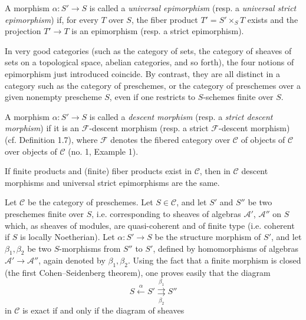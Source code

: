  A morphism $\alpha:S'\longrightarrow S$ is called a
\emph{universal epimorphism} (resp. a \emph{universal strict epimorphism}) if,
for every $T$ over $S$, the fiber product $T'=S'\times_ST$ exists and the
projection $T'\longrightarrow T$ is an epimorphism (resp. a strict
epimorphism).

In very good categories (such as the category of sets, the category of sheaves
of sets on a topological space, abelian categories, and so forth), the four
notions of epimorphism just introduced coincide. By contrast, they are all
distinct in a category such as the category of preschemes, or the category of
preschemes over a given nonempty prescheme $S$, even if one restricts to
$S$-schemes finite over $S$.

 A morphism $\alpha:S'\longrightarrow S$ is called a
\emph{descent morphism} (resp. a \emph{strict descent morphism}) if it is an
$\mathcal F$-descent morphism (resp. a strict $\mathcal F$-descent morphism)
(cf. Definition 1.7), where $\mathcal F$ denotes the fibered category over
$\mathcal C$ of objects of $\mathcal C$ over objects of $\mathcal C$ (no. 1,
Example 1).

 If finite products and (finite) fiber products exist
in $\mathcal C$, then in $\mathcal C$ descent morphisms and universal strict
epimorphisms are the same.

 Let $\mathcal C$ be the category of preschemes. Let
$S\in\mathcal C$, and let $S'$ and $S''$ be two preschemes finite over $S$,
i.e. corresponding to sheaves of algebras $\mathcal A'$, $\mathcal A''$ on $S$
which, as sheaves of modules, are quasi-coherent and of finite type (i.e.
coherent if $S$ is locally Noetherian). Let $\alpha:S'\longrightarrow S$ be the
structure morphism of $S'$, and let $\beta_1,\beta_2$ be two $S$-morphisms from
$S''$ to $S'$, defined by homomorphisms of algebras
$\mathcal A'\longrightarrow\mathcal A''$, again denoted by $\beta_1,\beta_2$.
Using the fact that a finite morphism is closed (the first Cohen--Seidenberg
theorem), one proves easily that the diagram
\[
  \tag{+}
  S\xleftarrow{\alpha}S'
  \overset{\beta_1}{\underset{\beta_2}{\rightrightarrows}}S''
\]
in $\mathcal C$ is exact if and only if the diagram of sheaves

